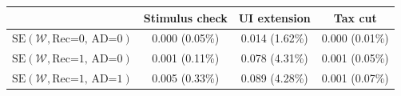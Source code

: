 \begin{tabular}{@{}lccc@{}}
\toprule
                          & Stimulus check      & UI extension    & Tax cut    \\  \midrule
$\mathrm{SE}(\mathcal{W}, \text{Rec=0, AD=0})$ & 0.000 (0.05\%)  & 0.014 (1.62\%)  & 0.000 (0.01\%)     \\
$\mathrm{SE}(\mathcal{W}, \text{Rec=1, AD=0})$ & 0.001 (0.11\%)  & 0.078 (4.31\%)  & 0.001 (0.05\%)     \\
$\mathrm{SE}(\mathcal{W}, \text{Rec=1, AD=1})$ & 0.005 (0.33\%)  & 0.089 (4.28\%)  & 0.001 (0.07\%)     \\ \bottomrule
\end{tabular}
